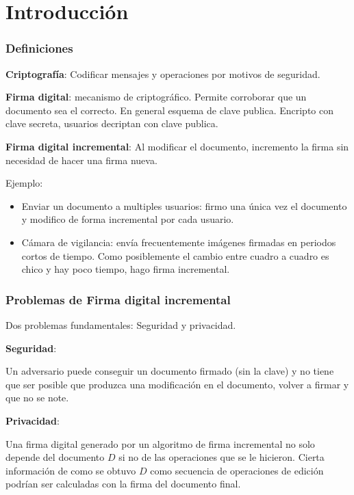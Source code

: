 \documentclass[10pt,handout]{beamer}
\begin{document}
\section{Introducción}
\begin{frame}
\frametitle{Definiciones}
\textbf{Criptografía}: Codificar mensajes y operaciones por motivos de seguridad.

\pause
\textbf{Firma digital}: mecanismo de criptográfico. Permite corroborar que un documento sea el correcto.
En general esquema de clave publica. Encripto con clave secreta, usuarios decriptan con clave publica.
\pause

\textbf{Firma digital incremental}: Al modificar el documento, incremento la
firma sin necesidad de hacer una firma nueva.

\pause
Ejemplo:
\begin{itemize}
  \item Enviar un documento a multiples usuarios: firmo una única vez el documento
    y modifico de forma incremental por cada usuario.
\pause
  \item Cámara de vigilancia: envía frecuentemente imágenes firmadas en periodos cortos de tiempo.
        Como posiblemente el cambio entre cuadro a cuadro es chico y hay poco tiempo, hago firma incremental.
\end{itemize}

\end{frame}

\begin{frame}
\frametitle{Problemas de Firma digital incremental}

Dos problemas fundamentales: Seguridad y privacidad.

\pause
\textbf{Seguridad}:

Un adversario puede conseguir un documento firmado (sin la clave) y no tiene que ser posible
que produzca una modificación en el documento, volver a firmar y que no se note.

\pause
\textbf{Privacidad}:

Una firma digital generado por un algoritmo de firma incremental no solo depende del documento
$D$ si no de las operaciones que se le hicieron.
Cierta información de como se  obtuvo $D$ como secuencia de operaciones de edición podrían ser
calculadas con la firma del documento final.
\end{frame}
\end{document}
